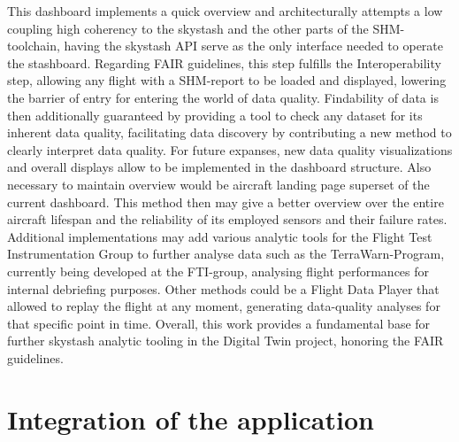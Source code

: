 This dashboard implements a quick overview and architecturally attempts a low coupling high coherency to the skystash and the other parts of the SHM-toolchain, having the skystash API serve as the only interface needed to operate the stashboard.
Regarding FAIR guidelines, this step fulfills the Interoperability step, allowing any flight with a SHM-report to be loaded and displayed, lowering the barrier of entry for entering the world of data quality. Findability of data is then additionally guaranteed by providing a tool to check any dataset for its inherent data quality, facilitating data discovery by contributing a new method to clearly interpret data quality.
For future expanses, new data quality visualizations and overall displays allow to be implemented in the dashboard structure. Also necessary to maintain overview would be aircraft landing page superset of the current dashboard. This method then may give a better overview over the entire aircraft lifespan and the reliability of its employed sensors and their failure rates. Additional implementations may add various analytic tools for the Flight Test Instrumentation Group to further analyse data such as the TerraWarn-Program, currently being developed at the FTI-group, analysing flight performances for internal debriefing purposes. Other methods could be a Flight Data Player that allowed to replay the flight at any moment, generating data-quality analyses for that specific point in time. Overall, this work provides a fundamental base for further skystash analytic tooling in the Digital Twin project, honoring the FAIR guidelines.


\section{Integration of the application}

